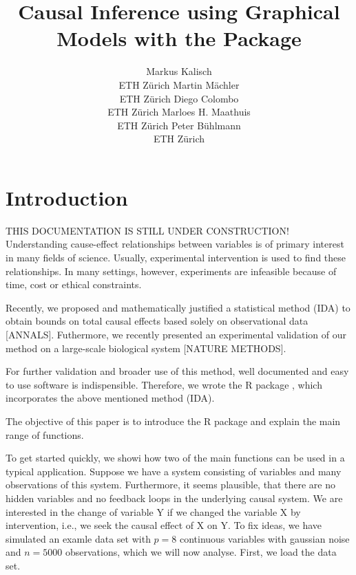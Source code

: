 \documentclass[article]{jss}
\author{Markus Kalisch\\ETH Z\"urich \And
        Martin M\"achler\\ETH Z\"urich \And
      Diego Colombo\\ETH Z\"urich \And
    Marloes H. Maathuis\\ETH Z\"urich \And
  Peter B\"uhlmann\\ETH Z\"urich}
\title{Causal Inference using Graphical Models with the Package \pkg{pcalg}}
\begin{document}

\section{Introduction}
THIS DOCUMENTATION IS STILL UNDER CONSTRUCTION! \\

Understanding cause-effect relationships between variables is of primary
interest in many fields of science. Usually, experimental intervention is
used to find these relationships. In many settings, however, experiments
are infeasible because of time, cost or ethical constraints.

Recently, we proposed and mathematically justified a statistical
method (IDA) to obtain bounds on total causal effects based solely on
observational data [ANNALS]. Futhermore, we recently presented an experimental
validation of our method on a large-scale biological system [NATURE METHODS].

For further validation and broader use of this method, well documented and
easy to use software is indispensible. Therefore, we wrote the R package
, which incorporates the above mentioned method (IDA).

The objective of this paper is to introduce the R package  and
explain the main range of functions.

To get started quickly, we showi how two of the main functions can be used
in a typical application. Suppose we have a system consisting of variables
and many observations of this system. Furthermore, it seems plausible, that
there are no hidden variables and no feedback loops in the underlying
causal system. We are interested in the change of variable Y if we changed
the variable X by intervention, i.e., we seek the causal effect of X on Y.
To fix ideas, we have simulated an examle data set with $p = 8$ continuous
variables with gaussian noise and $n = 5000$ observations, which we will
now analyse. First, we load the data set.

\end{document}
